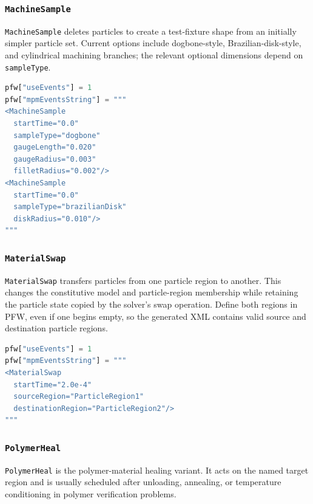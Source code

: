 \subsubsection{\texttt{MachineSample}}

\texttt{MachineSample} deletes particles to create a test-fixture shape from an initially simpler particle set.  Current options include dogbone-style, Brazilian-disk-style, and cylindrical machining branches; the relevant optional dimensions depend on \texttt{sampleType}.

\begin{lstlisting}[language=Python,caption={Sample-machining events.}]
pfw["useEvents"] = 1
pfw["mpmEventsString"] = """
<MachineSample
  startTime="0.0"
  sampleType="dogbone"
  gaugeLength="0.020"
  gaugeRadius="0.003"
  filletRadius="0.002"/>
<MachineSample
  startTime="0.0"
  sampleType="brazilianDisk"
  diskRadius="0.010"/>
"""
\end{lstlisting}

\subsubsection{\texttt{MaterialSwap}}

\texttt{MaterialSwap} transfers particles from one particle region to another.  This changes the constitutive model and particle-region membership while retaining the particle state copied by the solver's swap operation.  Define both regions in PFW, even if one begins empty, so the generated XML contains valid source and destination particle regions.

\begin{lstlisting}[language=Python,caption={Material-region swap event.}]
pfw["useEvents"] = 1
pfw["mpmEventsString"] = """
<MaterialSwap
  startTime="2.0e-4"
  sourceRegion="ParticleRegion1"
  destinationRegion="ParticleRegion2"/>
"""
\end{lstlisting}

\subsubsection{\texttt{PolymerHeal}}

\texttt{PolymerHeal} is the polymer-material healing variant.  It acts on the named target region and is usually scheduled after unloading, annealing, or temperature conditioning in polymer verification problems.


